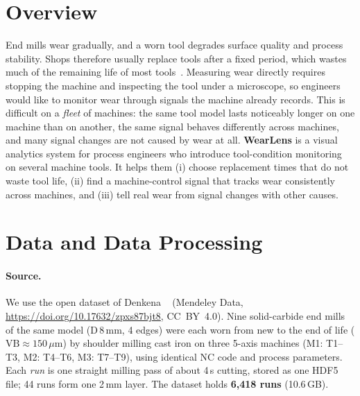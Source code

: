 
\section{Overview}
End mills wear gradually, and a worn tool degrades surface quality and process stability.
Shops therefore usually replace tools after a fixed period, which wastes much of the remaining life
of most tools~\cite{denkena2023}. Measuring wear directly requires stopping the machine and inspecting
the tool under a microscope, so engineers would like to monitor wear through signals the machine already
records. This is difficult on a \emph{fleet} of machines: the same tool model lasts noticeably longer on one
machine than on another, the same signal behaves differently across machines, and many signal changes are
not caused by wear at all.
\textbf{WearLens} is a visual analytics system for process engineers who introduce tool-condition
monitoring on several machine tools. It helps them
(i) choose replacement times that do not waste tool life,
(ii) find a machine-control signal that tracks wear consistently across machines, and
(iii) tell real wear from signal changes with other causes.

\section{Data and Data Processing}
\paragraph{Source.}
We use the open dataset of Denkena \etal~\cite{denkena2023}
(Mendeley Data, \url{https://doi.org/10.17632/zpxs87bjt8}, CC~BY~4.0).
Nine solid-carbide end mills of the same model (D\,8\,mm, 4 edges) were each worn from new to
the end of life ($\mathrm{VB}\approx150\,\mu$m) by shoulder milling cast iron on three 5-axis machines
(M1: T1--T3, M2: T4--T6, M3: T7--T9), using identical NC code and process parameters.
Each \emph{run} is one straight milling pass of about 4\,s cutting, stored as one HDF5 file;
44 runs form one 2\,mm layer. The dataset holds \textbf{6,418 runs} (10.6\,GB).

